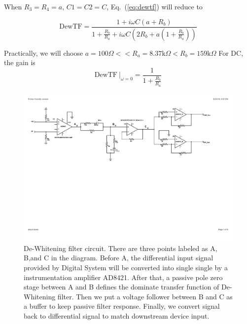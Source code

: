 When $R_3=R_4=a$, $C1=C2=C$, Eq.~(\ref{eq:dewtf}) will reduce to 

\begin{equation}
    \mathrm{DewTF} = \frac{1+i \omega C (a+ R_b)}{1+\frac{R_b}{R_a} + i \omega C (2 R_b + a(1+\frac{R_b}{R_a}))}
\end{equation}

Practically, we will choose $a=100\Omega << R_a =8.37\mathrm{k}\Omega < R_b =159\mathrm{k}\Omega $ For DC, the gain is 
\begin{equation}
    \mathrm{DewTF}\ \rvert_{\omega=0} = \frac{1}{1+\frac{R_b}{R_a}}
\end{equation}



\begin{figure}
\includegraphics[width=1\textwidth]{figure/DEWcircuit.pdf}
\caption[De-Whitening filter circuit]{De-Whitening filter circuit. There are three points labeled as A, B,and C in the diagram. Before A, the differential input signal provided by Digital System will be converted into single single by a instrumentation amplifier AD8421. After that, a passive pole zero stage between A and B defines the dominate transfer function of De-Whitening filter. Then we put a voltage follower between B and C as a buffer to keep passive filter response. Finally, we convert signal back to differential signal to match downstream device input. }\label{fig:dewcircuit}
\end{figure}



